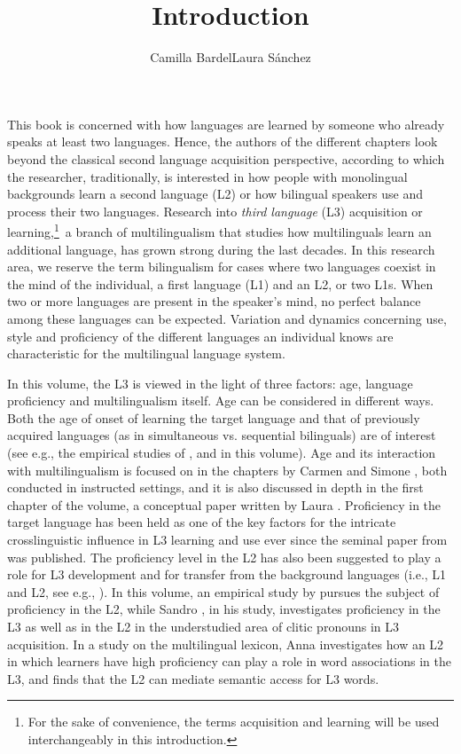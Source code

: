 \documentclass[output=paper,colorlinks,citecolor=brown,nonflat]{langsci/langscibook}
\author{Camilla Bardel\affiliation{Stockholm University}\lastand Laura Sánchez\affiliation{Stockholm University}}
\title{Introduction}
\begin{document}
\maketitle

This book is concerned with how languages are learned by someone who already speaks at least two languages. Hence, the authors of the different chapters look beyond the classical second language acquisition perspective, according to which the researcher, traditionally, is interested in how people with monolingual backgrounds learn a second language (L2) or how bilingual speakers use and process their two languages. Research into \textit{third language} (L3) acquisition or learning,\footnote{For the sake of convenience, the terms acquisition and learning will be used interchangeably in this introduction.}~a branch of multilingualism that studies how multilinguals learn an additional language, has grown strong during the last decades. In this research area, we reserve the term bilingualism for cases where two languages coexist in the mind of the individual, a first language (L1) and an L2, or two L1s. When two or more languages are present in the speaker’s mind, no perfect balance among these languages can be expected. Variation and dynamics concerning use, style and proficiency of the different languages an individual knows are characteristic for the multilingual language system.

In this volume, the L3 is viewed in the light of three factors: age, language proficiency and multilingualism itself. Age can be considered in different ways. Both the age of onset of learning the target language and that of previously acquired languages (as in simultaneous vs. sequential bilinguals) are of interest (see e.g., the empirical studies of \citeauthor{chapters/munoz}, \citeauthor{chapters/pfenninger} and \citeauthor{chapters/sanchez7} in this volume). Age and its interaction with multilingualism is focused on in the chapters by Carmen \citeauthor{chapters/munoz} and Simone \citeauthor{chapters/pfenninger}, both conducted in instructed settings, and it is also discussed in depth in the first chapter of the volume, a conceptual paper written by Laura \citeauthor{chapters/sanchez1}. Proficiency in the target language has been held as one of the key factors for the intricate crosslinguistic influence in L3 learning and use ever since the seminal paper from \citet{WilliamsHammarberg1998} was published. The proficiency level in the L2 has also been suggested to play a role for L3 development and for transfer from the background languages (i.e., L1 and L2, see e.g., \citealt{BardelLindqvist2007, SánchezBardel2017Transfer}). In this volume, an empirical study by \citeauthor{chapters/sanchez7} pursues the subject of proficiency in the L2, while Sandro \citeauthor{chapters/sciutti}, in his study, investigates proficiency in the L3 as well as in the L2 in the understudied area of clitic pronouns in L3 acquisition. In a study on the multilingual lexicon, Anna \citeauthor{chapters/gudmundson} investigates how an L2 in which learners have high proficiency can play a role in word associations in the L3, and finds that the L2 can mediate semantic access for L3 words.
\end{document}

